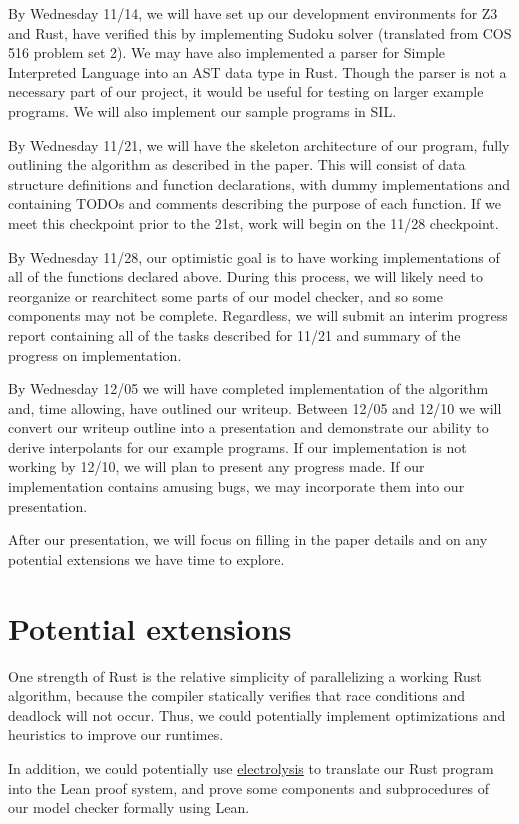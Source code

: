 \documentclass{article}
\begin{document}
By Wednesday 11/14, we will have set up our development environments for Z3 and Rust, have verified this by implementing Sudoku solver (translated from COS 516 problem set 2). We may have also implemented a parser for Simple Interpreted Language into an AST data type in Rust. Though the parser is not a necessary part of our project, it would be useful for testing on larger example programs. We will also implement our sample programs in SIL.

By Wednesday 11/21, we will have the skeleton architecture of our program, fully outlining the algorithm as described in the paper. This will consist of data structure definitions and function declarations, with dummy implementations and containing TODOs and comments describing the purpose of each function. If we meet this checkpoint prior to the 21st, work will begin on the 11/28 checkpoint.

By Wednesday 11/28, our optimistic goal is to have working implementations of all of the functions declared above. During this process, we will likely need to reorganize or rearchitect some parts of our model checker, and so some components may not be complete. Regardless, we will submit an interim progress report containing all of the tasks described for 11/21 and summary of the progress on implementation.

By Wednesday 12/05 we will have completed implementation of the algorithm and, time allowing, have outlined our writeup.
Between 12/05 and 12/10 we will convert our writeup outline into a presentation and demonstrate our ability to derive interpolants for our example programs.
If our implementation is not working by 12/10, we will plan to present any progress made. If our implementation contains amusing bugs, we may incorporate them into our presentation.

After our presentation, we will focus on filling in the paper details and on any potential extensions we have time to explore.

\section{Potential extensions}
One strength of Rust is the relative simplicity of parallelizing a working Rust algorithm, because the compiler statically verifies that race conditions and deadlock will not occur. Thus, we could potentially implement optimizations and heuristics to improve our runtimes. 

In addition, we could potentially use \href{https://kha.github.io/electrolysis/}{electrolysis} to translate our Rust program into the Lean proof system, and prove some components and subprocedures of our model checker formally using Lean.

\end{document}
